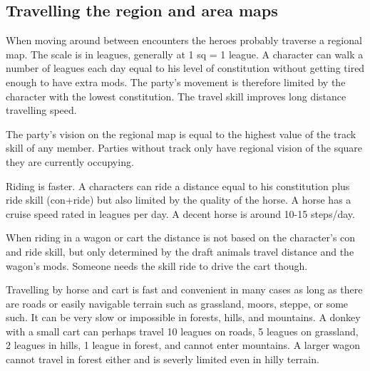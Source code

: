 \subsection*{Travelling the region and area maps}
When moving around between encounters the heroes probably traverse a regional map. The scale is in leagues, generally at 1 sq = 1 league. A character can walk a number of leagues each day equal to his level of constitution without getting tired enough to have extra mods. The party's movement is therefore limited by the character with the lowest constitution. The travel skill improves long distance travelling speed.

The party's vision on the regional map is equal to the highest value of the track skill of any member. Parties without track only have regional vision of the square they are currently occupying.

Riding is faster. A characters can ride a distance equal to his constitution plus ride skill (con+ride) but also limited by the quality of the horse. A horse has a cruise speed rated in leagues per day. A decent horse is around 10-15 steps/day.

When riding in a wagon or cart the distance is not based on the character's con and ride skill, but only determined by the draft animals travel distance and the wagon's mods. Someone needs the skill ride to drive the cart though.

Travelling by horse and cart is fast and convenient in many cases as long as there are roads or easily navigable terrain such as grassland, moors, steppe, or some such. It can be very slow or impossible in forests, hills, and mountains. A donkey with a small cart can perhaps travel 10 leagues on roads, 5 leagues on grassland, 2 leagues in hills, 1 league in forest, and cannot enter mountains. A larger wagon cannot travel in forest either and is severly limited even in hilly terrain.


%



